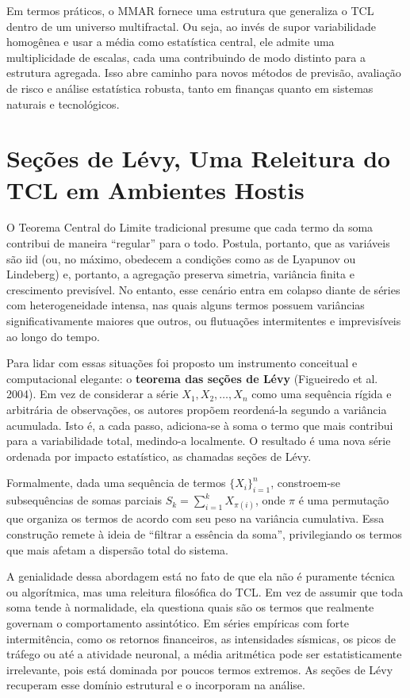 \documentclass[
  letterpaper,
  DIV=11,
  numbers=noendperiod]{scrartcl}
\begin{document}
Em termos práticos, o MMAR fornece uma estrutura que generaliza o TCL
dentro de um universo multifractal. Ou seja, ao invés de supor
variabilidade homogênea e usar a média como estatística central, ele
admite uma multiplicidade de escalas, cada uma contribuindo de modo
distinto para a estrutura agregada. Isso abre caminho para novos métodos
de previsão, avaliação de risco e análise estatística robusta, tanto em
finanças quanto em sistemas naturais e tecnológicos.

\section{Seções de Lévy, Uma Releitura do TCL em Ambientes
Hostis}\label{seuxe7uxf5es-de-luxe9vy-uma-releitura-do-tcl-em-ambientes-hostis}

O Teorema Central do Limite tradicional presume que cada termo da soma
contribui de maneira ``regular'' para o todo. Postula, portanto, que as
variáveis são iid (ou, no máximo, obedecem a condições como as de
Lyapunov ou Lindeberg) e, portanto, a agregação preserva simetria,
variância finita e crescimento previsível. No entanto, esse cenário
entra em colapso diante de séries com heterogeneidade intensa, nas quais
alguns termos possuem variâncias significativamente maiores que outros,
ou flutuações intermitentes e imprevisíveis ao longo do tempo.

Para lidar com essas situações foi proposto um instrumento conceitual e
computacional elegante: o \textbf{teorema das seções de Lévy}
(Figueiredo et al. 2004). Em vez de considerar a série
\(X_1, X_2, \dots, X_n\) como uma sequência rígida e arbitrária de
observações, os autores propõem reordená-la segundo a variância
acumulada. Isto é, a cada passo, adiciona-se à soma o termo que mais
contribui para a variabilidade total, medindo-a localmente. O resultado
é uma nova série ordenada por impacto estatístico, as chamadas seções de
Lévy.

Formalmente, dada uma sequência de termos \(\{X_i\}_{i=1}^n\),
constroem-se subsequências de somas parciais
\(S_k = \sum_{i=1}^k X_{\pi(i)}\), onde \(\pi\) é uma permutação que
organiza os termos de acordo com seu peso na variância cumulativa. Essa
construção remete à ideia de ``filtrar a essência da soma'',
privilegiando os termos que mais afetam a dispersão total do sistema.

A genialidade dessa abordagem está no fato de que ela não é puramente
técnica ou algorítmica, mas uma releitura filosófica do TCL. Em vez de
assumir que toda soma tende à normalidade, ela questiona quais são os
termos que realmente governam o comportamento assintótico. Em séries
empíricas com forte intermitência, como os retornos financeiros, as
intensidades sísmicas, os picos de tráfego ou até a atividade neuronal,
a média aritmética pode ser estatisticamente irrelevante, pois está
dominada por poucos termos extremos. As seções de Lévy recuperam esse
domínio estrutural e o incorporam na análise.
\end{document}
